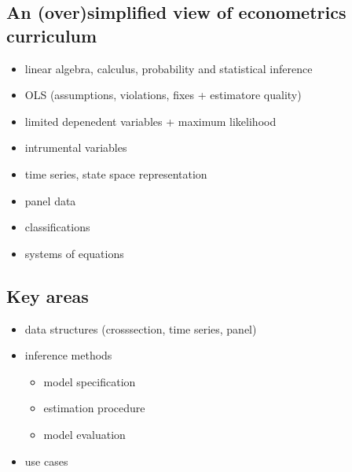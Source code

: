 \documentclass[letterpaper,10pt,english]{sphinxmanual}
\begin{document}
\subsection{An (over)simplified view of econometrics curriculum}
\label{\detokenize{how-to-teach/mindmap:an-over-simplified-view-of-econometrics-curriculum}}\begin{itemize}
\item {} 
linear algebra, calculus, probability and statistical inference

\item {} 
OLS (assumptions, violations, fixes + estimatore quality)

\item {} 
limited depenedent variables + maximum likelihood

\item {} 
intrumental variables

\item {} 
time series, state space representation

\item {} 
panel data

\item {} 
classifications

\item {} 
systems of equations

\end{itemize}


\subsection{Key areas}
\label{\detokenize{how-to-teach/mindmap:key-areas}}\begin{itemize}
\item {} 
data structures (crosssection, time series, panel)

\item {} 
inference methods
\begin{itemize}
\item {} 
model specification

\item {} 
estimation procedure

\item {} 
model evaluation

\end{itemize}

\item {} 
use cases

\end{itemize}
\end{document}
